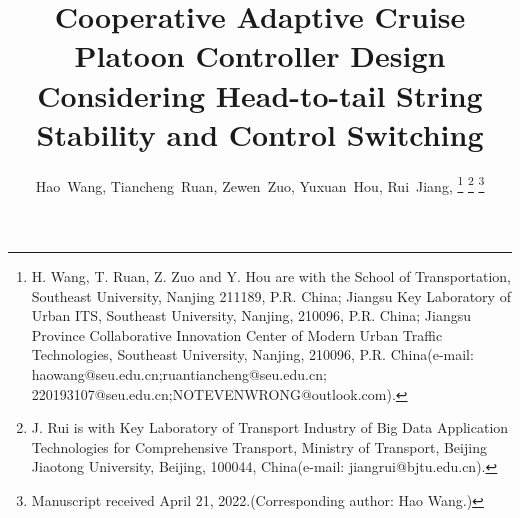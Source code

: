 \documentclass[journal]{IEEEtran}
\begin{document}
%
\title{Cooperative Adaptive Cruise Platoon Controller Design Considering Head-to-tail String Stability and Control Switching}
%
%
%

\author{Hao~Wang,
  Tiancheng~Ruan,
  Zewen~Zuo,
  Yuxuan~Hou,
  Rui~Jiang,
  \thanks{H. Wang, T. Ruan, Z. Zuo and Y. Hou are with the
    School of Transportation, Southeast University, Nanjing 211189, P.R. China;
    Jiangsu Key Laboratory of Urban ITS, Southeast University, Nanjing, 210096, P.R. China;
    Jiangsu Province Collaborative Innovation Center of Modern Urban Traffic Technologies, Southeast University, Nanjing, 210096, P.R. China(e-mail: haowang@seu.edu.cn;ruantiancheng@seu.edu.cn; 220193107@seu.edu.cn;NOTEVENWRONG@outlook.com).}%
  \thanks{J. Rui is with Key Laboratory of Transport Industry of Big Data Application Technologies for Comprehensive Transport, Ministry of Transport, Beijing Jiaotong University, Beijing, 100044,  China(e-mail: jiangrui@bjtu.edu.cn).}%
  \thanks{Manuscript received April 21, 2022.(Corresponding author: Hao Wang.)}}

% 
%
\end{document}
